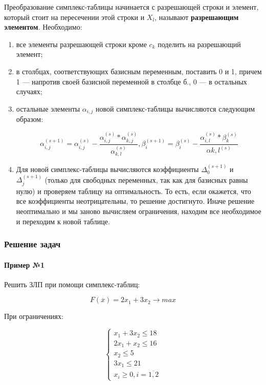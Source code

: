 \documentclass{article}
\begin{document}
Преобразование симплекс-таблицы начинается с разрешающей строки и элемент, который стоит на пересечении этой строки и $X_{l}$, называют \textbf{разрешающим элементом}. Необходимо:

\begin{enumerate}
    \item все элементы разрешающей строки кроме $c_{k}$ поделить на разрешающий элемент;
    \item в столбцах, соответствующих базисным переменным, поставить 0 и 1, причем 1 — напротив своей базисной переменной в столбце б., 0 — в остальных случаях;
    \item остальные элементы $\alpha_{i, j}$ новой симплекс-таблицы вычисляются следующим образом:
    
    $$\alpha_{i, j}^{(s + 1)} = \alpha_{i, j}^{(s)} - \frac{\alpha_{i, j}^{(s)} * \alpha_{k, j}^{(s)}}{\alpha_{k, l}^{(s)}}, \beta_{i}^{(s + 1)} = \beta_{i}^{(s)} - \frac{\alpha_{i, l}^{(s)} * \beta_{k}^{(s)}}{\alpha{k, l}^{(s)}}$$
    \item Для новой симплекс-таблицы вычисляются коэффициенты $\Delta_{0}^{(s + 1)}$ и $\Delta_{j}^{(s + 1)}$ (только для свободных переменных, так как для базисных равны нулю) и проверяем таблицу на оптимальность. То есть, если окажется, что все коэффициенты неотрицательны, то решение достигнуто. Иначе решение неоптимально и мы заново вычисляем ограничения, находим все необходимое и переходим к новой таблице.
\end{enumerate}

\subsubsection{Решение задач}

\paragraph{Пример №1} Решить ЗЛП при помощи симплекс-таблиц:

$$F(\overline{x}) = 2x_1 + 3x_2 \to max$$

При ограничениях:

$$
\begin{cases}
    x_1 + 3x_2 \le 18 \\
    2x_1 + x_2 \le 16 \\
    x_2 \le 5 \\
    3x_1 \le 21 \\
    x_{i} \ge 0, i = \overline{1, 2}
\end{cases}
$$
\end{document}
